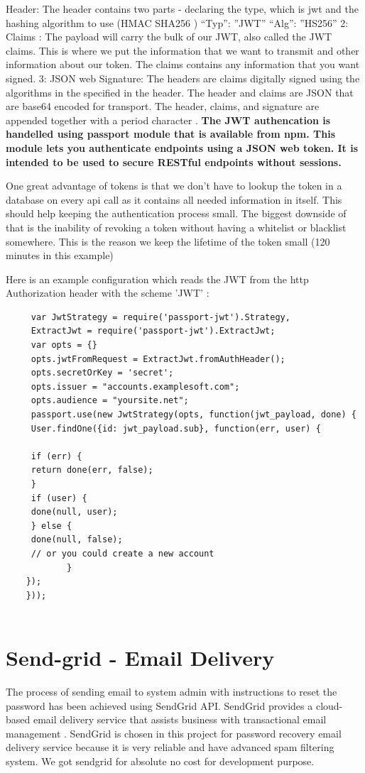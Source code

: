 		 Header: The header contains two parts - declaring the type, which is jwt and the hashing algorithm to use (HMAC SHA256 )
		 {
		 	“Typ”: ”JWT”
		 	“Alg”: ”HS256”
		 }
		 2: Claims :  The payload will carry the bulk of our JWT, also called the JWT claims\cite{AnatomyOfJWT}. This is where we put the information that we want to transmit and other information about our token. The claims contains any information that you want signed\cite{StormpathJWT}.
		 3: JSON web Signature: The headers are claims digitally signed using the algorithms in the specified in the header.  The header and claims are JSON that are base64 encoded for transport. The header, claims, and signature are appended together with a period character \cite{IETFRFC}
		 \cite{DraftIETAOAUTH}. \textbf{The JWT authencation is handelled using passport module that is available from npm. This module lets you authenticate endpoints using a JSON web token. It is intended to be used to secure RESTful endpoints without sessions.}
		 
		 
	\cite{HyphemeJWT} One great advantage of tokens is that we don't have to lookup the token in a database on every api call as it contains all needed information in itself. This should help keeping the authentication process small. The biggest downside of that is the inability of revoking a token without having a whitelist or blacklist somewhere. This is the reason we keep the lifetime of the token small (120 minutes in this example)
		 
 Here is  an example configuration which reads the JWT from the http Authorization header with the scheme 'JWT' \cite{JWTPassport}:
		 
\begin{verbatim}
	 var JwtStrategy = require('passport-jwt').Strategy,
	 ExtractJwt = require('passport-jwt').ExtractJwt;
	 var opts = {}
	 opts.jwtFromRequest = ExtractJwt.fromAuthHeader();
	 opts.secretOrKey = 'secret';
	 opts.issuer = "accounts.examplesoft.com";
	 opts.audience = "yoursite.net";
	 passport.use(new JwtStrategy(opts, function(jwt_payload, done) {
	 User.findOne({id: jwt_payload.sub}, function(err, user) {
		 
	 if (err) {
	 return done(err, false);
	 }
	 if (user) {
	 done(null, user);
	 } else {
	 done(null, false);
	 // or you could create a new account 
			}
	});
	}));
		 
\end{verbatim}

		
		\section{Send-grid - Email Delivery}
		 The  process of sending email to system admin with instructions to reset the password has been achieved using SendGrid API. SendGrid provides a cloud-based email delivery service that assists business with transactional email management \cite{sendGrid}. SendGrid is chosen in this project for password recovery email delivery service because it is very reliable and have advanced spam filtering system. We got sendgrid for absolute no cost for development purpose. 
		 
